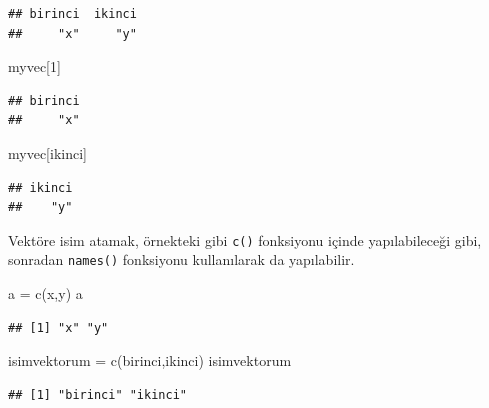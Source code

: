 \documentclass[
]{book}
\newenvironment{Shaded}{\begin{snugshade}}{\end{snugshade}}
\newcommand{\DecValTok}[1]{\textcolor[rgb]{0.00,0.00,0.81}{#1}}
\newcommand{\FunctionTok}[1]{\textcolor[rgb]{0.00,0.00,0.00}{#1}}
\newcommand{\NormalTok}[1]{#1}
\newcommand{\OtherTok}[1]{\textcolor[rgb]{0.56,0.35,0.01}{#1}}
\newcommand{\StringTok}[1]{\textcolor[rgb]{0.31,0.60,0.02}{#1}}
\begin{document}
\begin{verbatim}
## birinci  ikinci 
##     "x"     "y"
\end{verbatim}

\begin{Shaded}
\begin{Highlighting}[]
\NormalTok{myvec[}\DecValTok{1}\NormalTok{]}
\end{Highlighting}
\end{Shaded}

\begin{verbatim}
## birinci 
##     "x"
\end{verbatim}

\begin{Shaded}
\begin{Highlighting}[]
\NormalTok{myvec[}\StringTok{\textquotesingle{}ikinci\textquotesingle{}}\NormalTok{]}
\end{Highlighting}
\end{Shaded}

\begin{verbatim}
## ikinci 
##    "y"
\end{verbatim}

Vektöre isim atamak, örnekteki gibi \texttt{c()} fonksiyonu içinde yapılabileceği gibi, sonradan \texttt{names()} fonksiyonu kullanılarak da yapılabilir.

\begin{Shaded}
\begin{Highlighting}[]
\NormalTok{a }\OtherTok{=} \FunctionTok{c}\NormalTok{(}\StringTok{\textquotesingle{}x\textquotesingle{}}\NormalTok{,}\StringTok{\textquotesingle{}y\textquotesingle{}}\NormalTok{)}
\NormalTok{a}
\end{Highlighting}
\end{Shaded}

\begin{verbatim}
## [1] "x" "y"
\end{verbatim}

\begin{Shaded}
\begin{Highlighting}[]
\NormalTok{isimvektorum }\OtherTok{=} \FunctionTok{c}\NormalTok{(}\StringTok{\textquotesingle{}birinci\textquotesingle{}}\NormalTok{,}\StringTok{\textquotesingle{}ikinci\textquotesingle{}}\NormalTok{)}
\NormalTok{isimvektorum}
\end{Highlighting}
\end{Shaded}

\begin{verbatim}
## [1] "birinci" "ikinci"
\end{verbatim}
\end{document}
